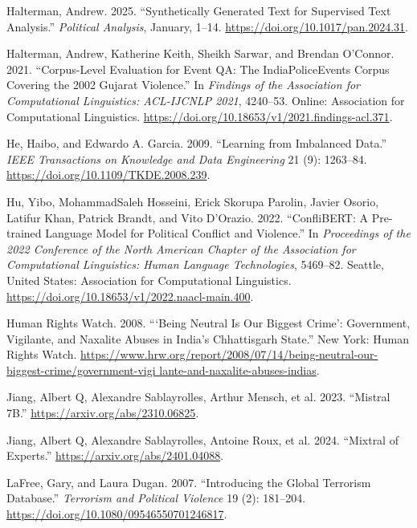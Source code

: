 \documentclass[
  11pt,
]{article}
\newlength{\cslhangindent}
\newenvironment{CSLReferences}[2] %
 {\begin{list}{}{%
  \setlength{\itemindent}{0pt}
  \setlength{\leftmargin}{0pt}
  \setlength{\parsep}{0pt}
  \ifodd #1
   \setlength{\leftmargin}{\cslhangindent}
   \setlength{\itemindent}{-1\cslhangindent}
  \fi
  \setlength{\itemsep}{#2\baselineskip}}}
 {\end{list}}
\begin{document}
\begin{CSLReferences}{1}{0}
Halterman, Andrew. 2025. {``Synthetically Generated Text for Supervised
Text Analysis.''} \emph{Political Analysis}, January, 1--14.
\url{https://doi.org/10.1017/pan.2024.31}.

Halterman, Andrew, Katherine Keith, Sheikh Sarwar, and Brendan O'Connor.
2021. {``Corpus-{Level Evaluation} for {Event QA}: {The
IndiaPoliceEvents Corpus Covering} the 2002 {Gujarat Violence}.''} In
\emph{Findings of the {Association} for {Computational Linguistics}:
{ACL-IJCNLP} 2021}, 4240--53. Online: Association for Computational
Linguistics. \url{https://doi.org/10.18653/v1/2021.findings-acl.371}.

He, Haibo, and Edwardo A. Garcia. 2009. {``Learning from {Imbalanced
Data}.''} \emph{IEEE Transactions on Knowledge and Data Engineering} 21
(9): 1263--84. \url{https://doi.org/10.1109/TKDE.2008.239}.

Hu, Yibo, MohammadSaleh Hosseini, Erick Skorupa Parolin, Javier Osorio,
Latifur Khan, Patrick Brandt, and Vito D'Orazio. 2022. {``{ConfliBERT}:
{A Pre-trained Language Model} for {Political Conflict} and
{Violence}.''} In \emph{Proceedings of the 2022 {Conference} of the
{North American Chapter} of the {Association} for {Computational
Linguistics}: {Human Language Technologies}}, 5469--82. Seattle, United
States: Association for Computational Linguistics.
\url{https://doi.org/10.18653/v1/2022.naacl-main.400}.

Human Rights Watch. 2008. {``{`{Being Neutral Is Our Biggest Crime}'}:
{Government}, {Vigilante}, and {Naxalite Abuses} in {India}'s
{Chhattisgarh State}.''} New York: Human Rights Watch.
\href{https://www.hrw.org/report/2008/07/14/being-neutral-our-biggest-crime/government-vigi\%20lante-and-naxalite-abuses-indias}{https://www.hrw.org/report/2008/07/14/being-neutral-our-biggest-crime/government-vigi
lante-and-naxalite-abuses-indias}.

Jiang, Albert Q, Alexandre Sablayrolles, Arthur Mensch, et al. 2023.
{``Mistral {7B}.''} \url{https://arxiv.org/abs/2310.06825}.

Jiang, Albert Q, Alexandre Sablayrolles, Antoine Roux, et al. 2024.
{``Mixtral of Experts.''} \url{https://arxiv.org/abs/2401.04088}.

LaFree, Gary, and Laura Dugan. 2007. {``Introducing the {Global
Terrorism Database}.''} \emph{Terrorism and Political Violence} 19 (2):
181--204. \url{https://doi.org/10.1080/09546550701246817}.


\end{CSLReferences}
\end{document}
